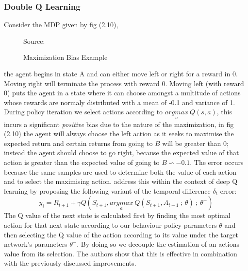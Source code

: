 \subsubsection{Double Q Learning }
Consider the MDP given by fig (2.10),
\begin{figure}[!htb]
    \caption{Maximization Bias Example}
    \begin{center}
    \end{center}
    \scriptsize{\dag Source: \cite{sutton2018reinforcement}}
\end{figure}
the agent begins in state A and can either move left or right for a reward in 0.
Moving right will terminate the process with reward 0. Moving left (with reward 0)
puts the agent in a state where it can choose amongst a multitude of actions whose
rewards are normaly distributed with a mean of -0.1 and variance of 1.
During policy iteration we select actions according to $\underset{a}{argmax} \: Q(s,a)$,
this incurs a significant \emph{positive} bias due to the nature of the maximization, in
fig (2.10) the agent will always choose the left action as it seeks to maximise the expected
return and certain returns from going to $B$ will be greater than 0; instead the agent should
choose to go right, because the expected value of that action is greater
than the expected value of going to $B \backsim -0.1$.
The error occurs because the same samples are used to determine both the value of each action and to select
the maximising action. \cite{Hasselt2015} address this within the context of deep Q learning
by proposing the following variant of the temporal difference $\delta_t$ error:
\begin{equation}
    y_i = R_{t+1} + \gamma Q(S_{t+1}, \underset{a}{argmax} \: Q(S_{t+1}, A_{t+1}\:;\:\theta)\:;\: \theta^-)
\end{equation}
The Q value of the next state is calculated first by finding the most optimal action for
that next state according to our behaviour policy parameters $\theta$ and then selecting
the Q value of the action according to its value under the target network's parameters $\theta^-$.
By doing so we decouple the estimation of an actions value from its selection. The authors
show that this is effective in combination with the previously discussed improvements.
